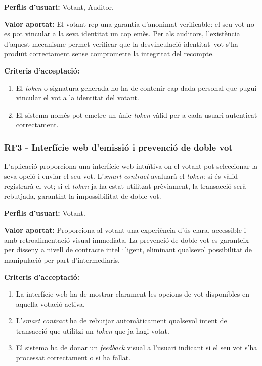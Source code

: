 \documentclass[12pt,a4paper,catalan]{article}
\begin{document}
\textbf{Perfils d'usuari:} Votant, Auditor.

\textbf{Valor aportat:} El votant rep una garantia d'anonimat verificable: el seu vot no es pot vincular a la seva identitat un cop emès. Per als auditors, l'existència d'aquest mecanisme permet verificar que la desvinculació identitat–vot s'ha produït correctament sense comprometre la integritat del recompte.

\textbf{Criteris d'acceptació:}
\begin{enumerate}[label=\roman*.]
    \item El \textit{token} o signatura generada no ha de contenir cap dada personal que pugui vincular el vot a la identitat del votant.
    \item El sistema només pot emetre un únic \textit{token} vàlid per a cada usuari autenticat correctament.
\end{enumerate}

\subsubsection*{RF3 - Interfície web d'emissió i prevenció de doble vot}

L'aplicació proporciona una interfície web intuïtiva on el votant pot seleccionar la seva opció i enviar el seu vot. L'\textit{smart contract} avaluarà el \textit{token}: si és vàlid registrarà el vot; si el \textit{token} ja ha estat utilitzat prèviament, la transacció serà rebutjada, garantint la impossibilitat de doble vot.

\textbf{Perfils d'usuari:} Votant.

\textbf{Valor aportat:} Proporciona al votant una experiència d'ús clara, accessible i amb retroalimentació visual immediata. La prevenció de doble vot es garanteix per disseny a nivell de contracte intel·ligent, eliminant qualsevol possibilitat de manipulació per part d'intermediaris.

\textbf{Criteris d'acceptació:}
\begin{enumerate}[label=\roman*.]
    \item La interfície web ha de mostrar clarament les opcions de vot disponibles en aquella votació activa.
    \item L'\textit{smart contract} ha de rebutjar automàticament qualsevol intent de transacció que utilitzi un \textit{token} que ja hagi votat.
    \item El sistema ha de donar un \textit{feedback} visual a l'usuari indicant si el seu vot s'ha processat correctament o si ha fallat.
\end{enumerate}
\end{document}
